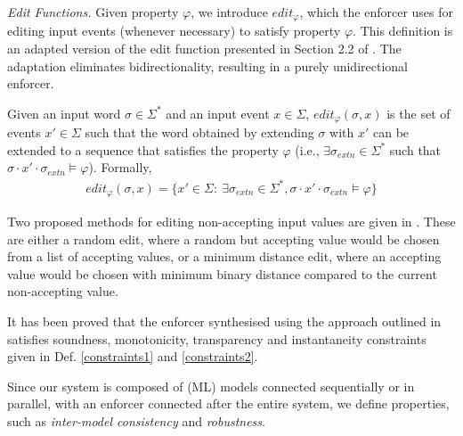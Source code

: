 \noindent \textit{Edit Functions.} Given property $\varphi$, we introduce $edit_{\varphi}$, which the enforcer uses for
editing input events (whenever necessary) to satisfy property $\varphi$. This definition is an adapted version of the edit function presented in Section 2.2 of \cite{10.1145/3126500}. The adaptation eliminates bidirectionality, resulting in a purely unidirectional enforcer.
\begin{definition}
 Given an input word $\sigma \in \Sigma^{\ast}$ and an input event $x \in \Sigma$, $edit_{\varphi}(\sigma, x)$ is the set of events $x' \in \Sigma$ such that the word obtained by extending $\sigma$ with $x'$ can be extended to a sequence that satisfies the property $\varphi$ (i.e., $\exists \sigma_{extn} \in  \Sigma^{\ast}$ such that $\sigma \cdot x' \cdot \sigma_{extn} \models \varphi$). Formally,
 \begin{align*}
 edit_{\varphi}(\sigma, x) = \{x' \in \Sigma:~ \exists \sigma_{extn} \in  \Sigma^{\ast}, \sigma \cdot x' \cdot \sigma_{extn} \models \varphi\}
 \end{align*}
\end{definition}
Two proposed methods for editing non-accepting input values are given in \cite{10.1145/3126500}. These are either a random edit, where a random but accepting value would be chosen from a list of accepting values, or a minimum distance edit, where an accepting value would be chosen with minimum binary distance compared to the current
non-accepting value.

\begin{remark}
 It has been proved that the enforcer synthesised using the approach outlined in \cite{10.1145/3126500} satisfies soundness, monotonicity, transparency and instantaneity constraints given in Def. \ref{constraints1} and \ref{constraints2}.
\end{remark}

Since our system is composed of (ML) models connected sequentially or in parallel, with an enforcer connected after the entire system, we define properties, such as \textit{inter-model consistency} and \textit{robustness}. %


